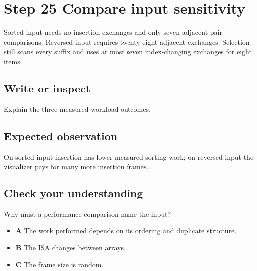 \section{Step 25 Compare input
  sensitivity}\label{009-sorting-visualizer-s25-step-25-compare-input-sensitivity}

Sorted input needs no insertion exchanges and only seven adjacent-pair
comparisons. Reversed input requires twenty-eight adjacent exchanges.
Selection still scans every suffix and uses at most seven index-changing
exchanges for eight items.

\subsection{Write or
  inspect}\label{009-sorting-visualizer-s25-write-or-inspect}

Explain the three measured workload outcomes.

\subsection{Expected
  observation}\label{009-sorting-visualizer-s25-expected-observation}

On sorted input insertion has lower measured sorting work; on reversed
input the visualizer pays for many more insertion frames.

\subsection{Check your
  understanding}\label{009-sorting-visualizer-s25-check-your-understanding}

Why must a performance comparison name the input?

\begin{itemize}
  \tightlist
  \item
        \textbf{A} The work performed depends on its ordering and duplicate
        structure.
  \item
        \textbf{B} The ISA changes between arrays.
  \item
        \textbf{C} The frame size is random.
\end{itemize}

